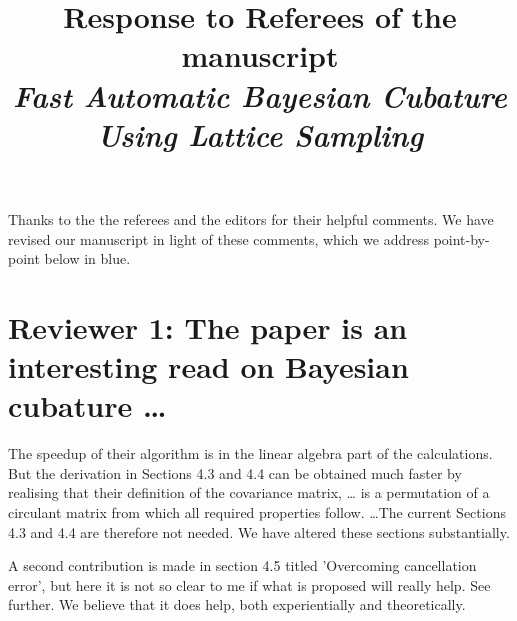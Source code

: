 \documentclass{amsart}
\begin{document}
\title[Response for Fast Automatic Bayesian Cubature]{Response to Referees of the manuscript \\
\emph{Fast Automatic Bayesian Cubature Using Lattice Sampling}}
\maketitle

\newcommand{\Response}[1]{{\color{blue}#1}}
\renewcommand{\vec}[1]{\boldsymbol{#1}}
\newcommand{\vtheta}{\vec{\theta}}

Thanks to the the referees and the editors for their helpful comments.  We have revised our manuscript in light of these comments, \Response{which we address point-by-point below in blue.}

\section*{Reviewer 1: The paper is an interesting read on Bayesian cubature \ldots}

The speedup of their algorithm is in the linear algebra part of the
calculations. But the derivation in Sections 4.3 and 4.4 can be obtained much
faster by realising that their definition of the covariance matrix, \ldots 
is a permutation of a circulant matrix from which all required properties follow. \ldots The current Sections 4.3 and 4.4 are therefore not
needed. \Response{We have altered these sections substantially.}

A second contribution is made in section 4.5 titled 'Overcoming cancellation
error', but here it is not so clear to me if what is proposed will really help.
See further. \Response{We believe that it does help, both experientially and theoretically.}
\end{document}
